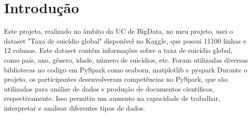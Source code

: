 \documentclass{article}
\begin{document}

\newpage
{}

\tableofcontents

\newpage
{}

\section{Introdução}\label{sec:introducao} %
Este projeto, realizado no âmbito da UC de BigData, no meu projeto, usei o dataset "Taxa de suicídio global" disponível no Kaggle, que possui 11100 linhas e 12 colunas. Este dataset contém informações sobre a taxa de suicídio global, como país, ano, gênero, idade, número de suicídios, etc. Foram utilizadas diversas bibliotecas no codigo em PySpark como seaborn, matplotlib e pyspark  Durante o projeto, os participantes desenvolveram competências no PySpark, que são utilizados para análise de dados e produção de documentos científicos, respectivamente. Isso permitiu um aumento na capacidade de trabalhar, interpretar e analisar diferentes tipos de dados.
\end{document}
